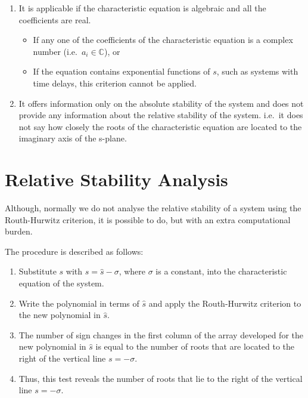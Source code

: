\documentclass[
  14pt,
  a4paper,
  oneside,
  open=any,
  a4paper,
  14pt]{report}
\providecommand{\tightlist}{%
  \setlength{\itemsep}{0pt}\setlength{\parskip}{0pt}}\usepackage{longtable,booktabs,array}
\begin{document}
\begin{enumerate}
\def\labelenumi{\arabic{enumi}.}
\tightlist
\item
  It is applicable if the characteristic equation is algebraic and all
  the coefficients are real.

  \begin{itemize}
  \tightlist
  \item
    If any one of the coefficients of the characteristic equation is a
    complex number (i.e.~\(a_i \in \mathbb{C}\)), or
  \item
    If the equation contains exponential functions of \(s\), such as
    systems with time delays, this criterion cannot be applied.
  \end{itemize}
\item
  It offers information only on the absolute stability of the system and
  does not provide any information about the relative stability of the
  system. i.e.~it does not say how closely the roots of the
  characteristic equation are located to the imaginary axis of the
  s-plane.
\end{enumerate}

\section{Relative Stability Analysis}\label{relative-stability-analysis}

Although, normally we do not analyse the relative stability of a system
using the Routh-Hurwitz criterion, it is possible to do, but with an
extra computational burden.

The procedure is described as follows:

\begin{enumerate}
\def\labelenumi{\arabic{enumi}.}
\item
  Substitute \(s\) with \(s = \hat{s} - \sigma\), where \(\sigma\) is a
  constant, into the characteristic equation of the system.
\item
  Write the polynomial in terms of \(\hat{s}\) and apply the
  Routh-Hurwitz criterion to the new polynomial in \(\hat{s}\).
\item
  The number of sign changes in the first column of the array developed
  for the new polynomial in \(\hat{s}\) is equal to the number of roots
  that are located to the right of the vertical line \(s=-\sigma\).
\item
  Thus, this test reveals the number of roots that lie to the right of
  the vertical line \(s=-\sigma\).
\end{enumerate}
\end{document}
